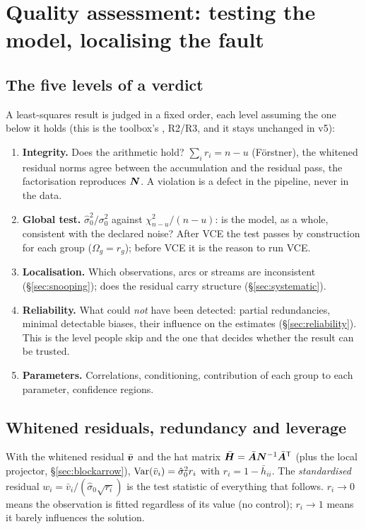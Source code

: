 \chapter{Quality assessment: testing the model, localising the fault}
\label{ch:quality}

\section{The five levels of a verdict}
\label{sec:verdict}

A least-squares result is judged in a fixed order, each level assuming the one below it holds (this is the toolbox's , R2/R3, and it stays unchanged in v5):
\begin{enumerate}[label=\textbf{\arabic*}, start=0]
\item \textbf{Integrity.} Does the arithmetic hold? $\sum_i r_i = n - u$ (Förstner), the whitened residual norms agree between the accumulation and the residual pass, the factorisation reproduces $\bm{N}$. A violation is a defect in the pipeline, never in the data.
\item \textbf{Global test.} $\hat\sigma_0^2/\sigma_0^2$ against $\chi^2_{n-u}/(n-u)$: is the model, as a whole, consistent with the declared noise? After VCE the test passes by construction for each group ($\Omega_g = r_g$); before VCE it is the reason to run VCE.
\item \textbf{Localisation.} Which observations, arcs or streams are inconsistent (\S\ref{sec:snooping}); does the residual carry structure (\S\ref{sec:systematic}).
\item \textbf{Reliability.} What could \emph{not} have been detected: partial redundancies, minimal detectable biases, their influence on the estimates (\S\ref{sec:reliability}). This is the level people skip and the one that decides whether the result can be trusted.
\item \textbf{Parameters.} Correlations, conditioning, contribution of each group to each parameter, confidence regions.
\end{enumerate}

\section{Whitened residuals, redundancy and leverage}

With the whitened residual $\bar{\bm{v}}$ and the hat matrix $\bar{\bm{H}} = \bar{\bm{A}}\bm{N}^{-1}\bar{\bm{A}}^{\mathsf T}$ (plus the local projector, \S\ref{sec:blockarrow}), $\operatorname{Var}(\bar v_i) = \hat\sigma_0^2 r_i$ with $r_i = 1 - \bar h_{ii}$. The \emph{standardised} residual $w_i = \bar v_i/(\hat\sigma_0\sqrt{r_i})$ is the test statistic of everything that follows. $r_i \to 0$ means the observation is fitted regardless of its value (no control); $r_i \to 1$ means it barely influences the solution.

